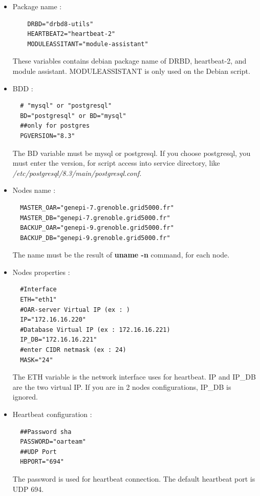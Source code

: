 \documentclass[a4paper,10pt]{report}
\begin{document}
\begin{itemize}
 \item Package name :\\
    \begin{lstlisting}
    DRBD="drbd8-utils"
    HEARTBEAT2="heartbeat-2"
    MODULEASSITANT="module-assistant"
    \end{lstlisting}
  These variables contains debian package name of DRBD, heartbeat-2, and module assistant. MODULEASSISTANT is only used on the Debian script.

 \item BDD :\\
  \begin{lstlisting}
  # "mysql" or "postgresql"
  BD="postgresql" or BD="mysql"
  ##only for postgres
  PGVERSION="8.3"
  \end{lstlisting}
The BD variable must be mysql or postgresql. If you choose postgresql, you must enter the version, for script access into service directory, like \textit{/etc/postgresql/8.3/main/postgresql.conf}.

 \item Nodes name :\\
  \begin{lstlisting}
  MASTER_OAR="genepi-7.grenoble.grid5000.fr"
  MASTER_DB="genepi-7.grenoble.grid5000.fr"
  BACKUP_OAR="genepi-9.grenoble.grid5000.fr"
  BACKUP_DB="genepi-9.grenoble.grid5000.fr"
  \end{lstlisting}
The name must be the result of \textbf{uname -n} command, for each node.

  \item Nodes properties :\\
  \begin{lstlisting}
  #Interface
  ETH="eth1"
  #OAR-server Virtual IP (ex : )
  IP="172.16.16.220"
  #Database Virtual IP (ex : 172.16.16.221)
  IP_DB="172.16.16.221"
  #enter CIDR netmask (ex : 24)
  MASK="24"
  \end{lstlisting}
The ETH variable is the network interface uses for heartbeat. IP and IP\_DB are the two virtual IP. If you are in 2 nodes configurations, IP\_DB is ignored.

  \item Heartbeat configuration :\\
  \begin{lstlisting}
  ##Password sha
  PASSWORD="oarteam"
  ##UDP Port
  HBPORT="694"
  \end{lstlisting}
The password is used for heartbeat connection. The default heartbeat port is UDP 694.


\end{itemize}
\end{document}
